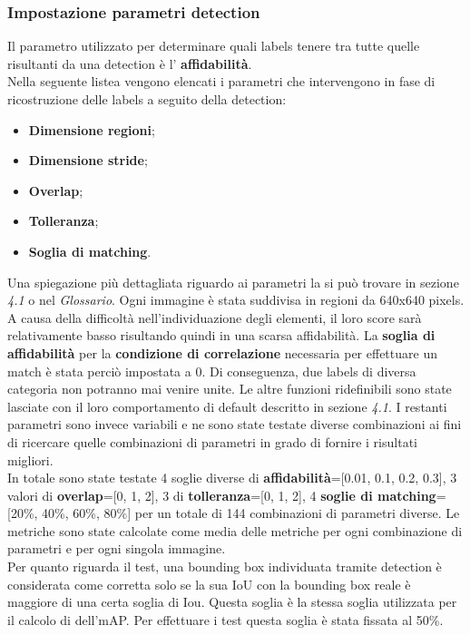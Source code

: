 \subsubsection{Impostazione parametri detection}
Il parametro utilizzato per determinare quali labels tenere tra tutte quelle risultanti da una detection è
l' \textbf{affidabilità}.\\
Nella seguente listea vengono elencati i parametri che intervengono in fase di ricostruzione delle labels a seguito della detection:
\begin{itemize}
\item \textbf{Dimensione regioni};
\item \textbf{Dimensione stride};
\item \textbf{Overlap};
\item \textbf{Tolleranza};
\item \textbf{Soglia di matching}.
\end{itemize}
Una spiegazione più dettagliata riguardo ai parametri la si può trovare in sezione \textit{4.1} o nel \textit{Glossario}.
Ogni immagine è stata suddivisa in regioni da 640x640 pixels. A causa della difficoltà nell'individuazione degli elementi, il loro score sarà relativamente basso risultando quindi in una scarsa affidabilità. La \textbf{soglia di affidabilità} per la \textbf{condizione di correlazione} necessaria per effettuare un match è stata perciò impostata a 0. Di conseguenza, due labels di diversa categoria non potranno mai venire unite. Le altre funzioni ridefinibili sono state lasciate con il loro comportamento di default descritto in sezione \textit{4.1}. I restanti parametri sono invece variabili e ne sono state testate diverse combinazioni ai fini di ricercare quelle combinazioni di parametri in grado di fornire i risultati migliori.
\\
In totale sono state testate 4 soglie diverse di \textbf{affidabilità}=[0.01, 0.1, 0.2, 0.3], 3 valori di \textbf{overlap}=[0, 1, 2], 3 di \textbf{tolleranza}=[0, 1, 2], 4 \textbf{soglie di matching}=[20\%, 40\%, 60\%, 80\%] per un totale di 144 combinazioni di parametri diverse. Le metriche sono state calcolate come media delle metriche per ogni combinazione di parametri e per ogni singola immagine.\\
Per quanto riguarda il test, una bounding box individuata tramite detection è considerata come corretta solo se la sua IoU con la bounding box reale è maggiore di una certa soglia di Iou. Questa soglia è la stessa soglia utilizzata per il calcolo di dell'mAP. Per effettuare i test questa soglia è stata fissata al 50\%.

